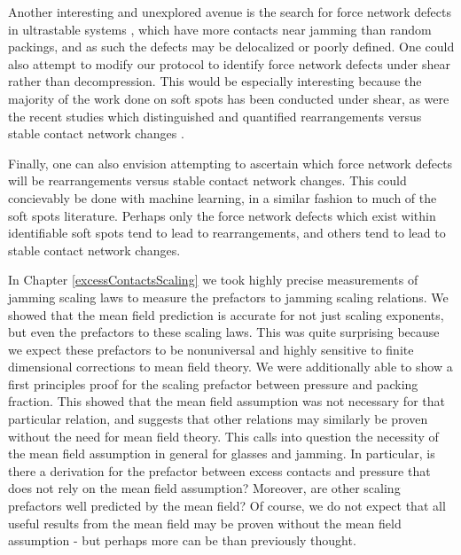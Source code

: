 Another interesting and unexplored avenue is the search for force network defects in ultrastable systems \cite{kapteijns_fast_2019,hagh_transient_2021,ninarello_models_2017}, which have more contacts near jamming than random packings, and as such the defects may be delocalized or poorly defined. One could also attempt to modify our protocol to identify force network defects under shear rather than decompression. This would be especially interesting because the majority of the work done on soft spots has been conducted under shear, as were the recent studies which distinguished and quantified rearrangements versus stable contact network changes \cite{morse_differences_2020,tuckman_contact_2020}.

Finally, one can also envision attempting to ascertain which force network defects will be rearrangements versus stable contact network changes. This could concievably be done with machine learning, in a similar fashion to much of the soft spots literature. Perhaps only the force network defects which exist within identifiable soft spots tend to lead to rearrangements, and others tend to lead to stable contact network changes. 

In Chapter \ref{excessContactsScaling} we took highly precise measurements of jamming scaling laws to measure the prefactors to jamming scaling relations. We showed that the mean field prediction is accurate for not just scaling exponents, but even the prefactors to these scaling laws. This was quite surprising because we expect these prefactors to be nonuniversal and highly sensitive to finite dimensional corrections to mean field theory. We were additionally able to show a first principles proof for the scaling prefactor between pressure and packing fraction. This showed that the mean field assumption was not necessary for that particular relation, and suggests that other relations may similarly be proven without the need for mean field theory. This calls into question the necessity of the mean field assumption in general for glasses and jamming. In particular, is there a derivation for the prefactor between excess contacts and pressure that does not rely on the mean field assumption? Moreover, are other scaling prefactors well predicted by the mean field?  Of course, we do not expect that all useful results from the mean field may be proven without the mean field assumption - but perhaps more can be than previously thought. 
